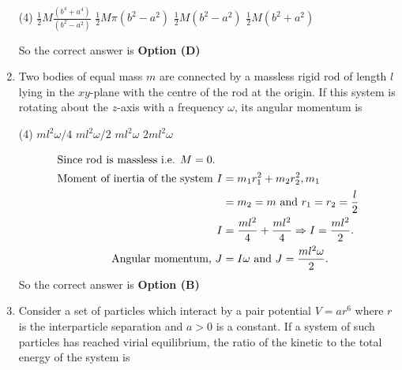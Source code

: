 \begin{enumerate}
\begin{tasks}(4)
\task[\textbf{A.}] $\frac{1}{2} M \frac{\left(b^{4}+a^{4}\right)}{\left(b^{2}-a^{2}\right)}$
\task[\textbf{B.}] $\frac{1}{2} M \pi\left(b^{2}-a^{2}\right)$
\task[\textbf{C.}]  $\frac{1}{2} M\left(b^{2}-a^{2}\right)$
\task[\textbf{D.}] $\frac{1}{2} M\left(b^{2}+a^{2}\right)$
\end{tasks}
\begin{answer}
So the correct answer is \textbf{Option (D)}
\end{answer}
	\item Two bodies of equal mass $m$ are connected by a massless rigid rod of length $l$ lying in the $x y$-plane with the centre of the rod at the origin. If this system is rotating about the $z$-axis with a frequency $\omega$, its angular momentum is

\begin{tasks}(4)
\task[\textbf{A.}] $m l^{2} \omega / 4$
\task[\textbf{B.}] $m l^{2} \omega / 2$
\task[\textbf{C.}] $m l^{2} \omega$
\task[\textbf{D.}]  $2 m l^{2} \omega$
\end{tasks}
\begin{answer}
\begin{align*}
\intertext{Since rod is massless i.e. $M=0$.}
\text{Moment of inertia of the system }I&=m_{1} r_{1}^{2}+m_{2} r_{2}^{2}, m_{1}\\&=m_{2}=m\text{ and }r_{1}=r_{2}=\frac{l}{2}\\
I&=\frac{m l^{2}}{4}+\frac{m l^{2}}{4} \Rightarrow I=\frac{m l^{2}}{2}.\\\text{ Angular momentum, }J&=I \omega\text{ and }J=\frac{m l^{2} \omega}{2}.
\end{align*}
So the correct answer is \textbf{Option (B)}
\end{answer}

	\item Consider a set of particles which interact by a pair potential $V=a r^{6}$ where $r$ is the interparticle separation and $a>0$ is a constant. If a system of such particles has reached virial equilibrium, the ratio of the kinetic to the total energy of the system is


\end{enumerate}
